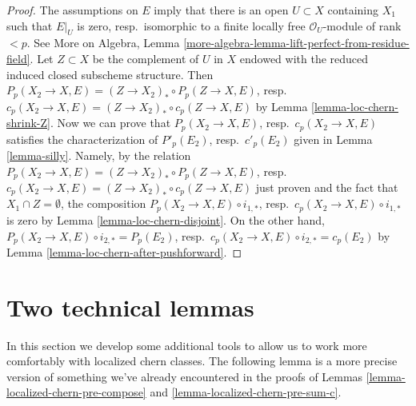 \begin{proof}
The assumptions on $E$ imply that there is an open $U \subset X$
containing $X_1$ such that $E|_U$ is zero, resp.\ isomorphic to a finite locally
free $\mathcal{O}_U$-module of rank $< p$. See More on Algebra, Lemma
\ref{more-algebra-lemma-lift-perfect-from-residue-field}.
Let $Z \subset X$ be the complement of $U$ in $X$ endowed with
the reduced induced closed subscheme structure. Then
$P_p(X_2 \to X, E) = (Z \to X_2)_* \circ P_p(Z \to X, E)$,
resp.\ $c_p(X_2 \to X, E) = (Z \to X_2)_* \circ c_p(Z \to X, E)$
by Lemma \ref{lemma-loc-chern-shrink-Z}.
Now we can prove that $P_p(X_2 \to X, E)$, resp.\ $c_p(X_2 \to X, E)$
satisfies the characterization of $P'_p(E_2)$, resp.\ $c'_p(E_2)$
given in Lemma \ref{lemma-silly}. Namely, by the relation
$P_p(X_2 \to X, E) = (Z \to X_2)_* \circ P_p(Z \to X, E)$,
resp.\ $c_p(X_2 \to X, E) = (Z \to X_2)_* \circ c_p(Z \to X, E)$
just proven and the fact that $X_1 \cap Z = \emptyset$,
the composition $P_p(X_2 \to X, E) \circ i_{1, *}$,
resp.\ $c_p(X_2 \to X, E) \circ i_{1, *}$ is zero
by Lemma \ref{lemma-loc-chern-disjoint}.
On the other hand,
$P_p(X_2 \to X, E) \circ i_{2, *} = P_p(E_2)$,
resp.\ $c_p(X_2 \to X, E) \circ i_{2, *} = c_p(E_2)$
by Lemma \ref{lemma-loc-chern-after-pushforward}.
\end{proof}





\section{Two technical lemmas}
\label{section-tools-loc-chern}

\noindent
In this section we develop some additional tools to allow us to work
more comfortably with localized chern classes. The following lemma
is a more precise version of something we've already encountered in
the proofs of Lemmas \ref{lemma-localized-chern-pre-compose} and
\ref{lemma-localized-chern-pre-sum-c}.

